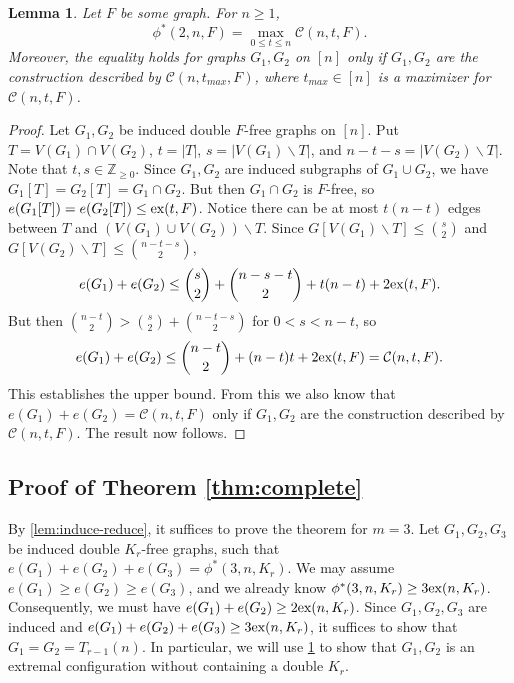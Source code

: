 \documentclass[12pt]{article}
\newtheorem{lemma}[theorem]{Lemma}
\newcommand*{\Z}{\mathbb{Z}}
\newcommand*{\ex}{\textnormal{ex}}
\newcommand*{\con}{\mathcal{C}}
\begin{document}
\begin{lemma}\label{lem:optimize-con}
  Let $F$ be some graph. For $n \geq 1$,
  \[
    \phi^*(2, n, F) = \max_{0 \leq t \leq n} \con(n, t, F).
  \]
  Moreover, the equality holds for graphs $G_1, G_2$ on $[n]$ only if $G_1, G_2$ are the construction described by $\con(n, t_{max}, F)$, where $t_{max} \in [n]$ is a maximizer for $\con(n, t, F)$.
\end{lemma}

\begin{proof}
  Let $G_1, G_2$ be induced double $F$-free graphs on $[n]$. Put $T = V(G_1) \cap V(G_2)$, $t = |T|$, $s = |V(G_1) \backslash T|$, and $n - t - s = |V(G_2) \backslash T|$. Note that $t, s \in \Z_{\geq 0}$. Since $G_1, G_2$ are induced subgraphs of $G_1 \cup G_2$, we have $G_1[T] = G_2[T] = G_1 \cap G_2$. But then $G_1 \cap G_2$ is $F$-free, so $e(G_1[T]) = e(G_2[T]) \leq \ex(t, F)$. Notice there can be at most $t(n - t)$ edges between $T$ and $(V(G_1) \cup V(G_2)) \backslash T$. Since $G[V(G_1) \backslash T] \leq \binom{s}{2}$ and $G[V(G_2) \backslash T] \leq \binom{n - t - s}{2}$,
  \[
    e(G_1) + e(G_2) \leq \binom{s}{2} + \binom{n - s - t}{2} + t(n - t) + 2\ex(t, F).
  \]
  But then $\binom{n - t}{2} > \binom{s}{2} + \binom{n - t - s}{2}$ for $0 < s < n - t$, so
  \[
    e(G_1) + e(G_2) \leq \binom{n - t}{2} + (n - t)t + 2\ex(t, F) = \con(n, t, F).
  \]
  This establishes the upper bound. From this we also know that $e(G_1) + e(G_2) = \con(n, t, F)$ only if $G_1, G_2$ are the construction described by $\con(n, t, F)$. The result now follows.
\end{proof}

\subsection{Proof of Theorem \ref{thm:complete}}

By \cref{lem:induce-reduce}, it suffices to prove the theorem for $m = 3$. Let $G_1, G_2, G_3$ be induced double $K_r$-free graphs, such that $e(G_1) + e(G_2) + e(G_3) = \phi^*(3, n, K_r)$. We may assume $e(G_1) \geq e(G_2) \geq e(G_3)$, and we already know $\phi^*(3, n, K_r) \geq 3\ex(n, K_r)$. Consequently, we must have $e(G_1) + e(G_2) \geq 2\ex(n, K_r)$. Since $G_1, G_2, G_3$ are induced and $e(G_1) + e(G_2) + e(G_3) \geq 3\ex(n, K_r)$, it suffices to show that $G_1 = G_2 = T_{r - 1}(n)$. In particular, we will use \cref{lem:optimize-con} to show that $G_1, G_2$ is an extremal configuration without containing a double $K_r$. 
\end{document}
